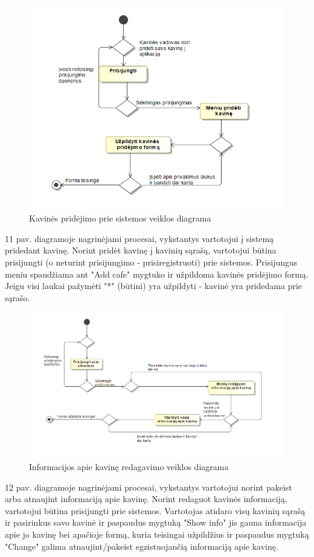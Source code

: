 \documentclass{VUMIFPSkursinis}
\begin{document}
\begin{figure}[H]
    \centering
    \includegraphics[width=\textwidth,height=\textheight,keepaspectratio]{img/addcafe} 
    \caption{Kavinės pridėjimo prie sistemos veiklos diagrama}
    \label{img:addcafe}
\end{figure}
11 pav.   diagramoje nagrinėjami procesai, vykstantys vartotojui į sistemą pridedant kavinę. Norint pridėt kavinę į kavinių sąrašą, vartotojui būtina prisijungti (o neturint prisijungimo - prisiregistruoti) prie sistemos. Prisijungus meniu spaudžiama ant "Add cafe" mygtuko ir užpildoma kavinės pridėjimo formą. Jeigu visi laukai pažymėti "*" (būtini) yra užpildyti - kavinė yra pridedama prie sąrašo. 

\begin{figure}[H]
    \centering
    \includegraphics[width=\textwidth,height=\textheight,keepaspectratio]{img/editcafe} 
    \caption{Informacijos apie kavinę redagavimo veiklos diagrama}
    \label{img:editcafe}
\end{figure}
12 pav.   diagramoje nagrinėjami procesai, vykstantys vartotojui norint pakeist arba atnaujint informaciją apie kavinę. Norint redaguot kavinės informaciją, vartotojui būtina prisijungti prie sistemos. Vartotojas atidaro visų kavinių sąrašą ir pasirinkus savo kavinė ir paspaudus mygtuką "Show info" jis gauna informacija apie jo kavinę bei apačioje formą, kuria teisingai užpildžius ir paspaudus mygtuką "Change" galima atnaujint/pakeist egzistuojančią informaciją apie kavinę.
\end{document}
